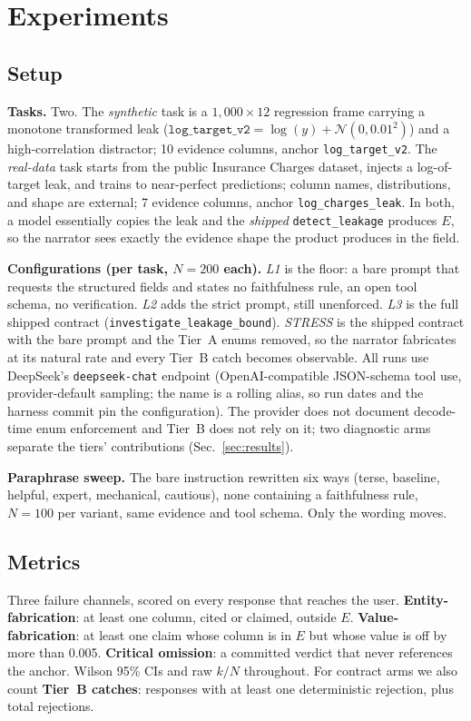 \documentclass[conference]{IEEEtran}
\begin{document}
\section{Experiments}
\label{sec:experiments}
\subsection{Setup}
\textbf{Tasks.} Two. The \emph{synthetic} task is a $1{,}000 \times 12$ regression frame carrying a monotone transformed leak ($\texttt{log\_target\_v2} = \log(y) + \mathcal{N}(0, 0.01^2)$) and a high-correlation distractor; 10 evidence columns, anchor \texttt{log\_target\_v2}. The \emph{real-data} task starts from the public Insurance Charges dataset, injects a log-of-target leak, and trains to near-perfect predictions; column names, distributions, and shape are external; 7 evidence columns, anchor \texttt{log\_charges\_leak}. In both, a model essentially copies the leak and the \emph{shipped} \texttt{detect\_leakage} produces $E$, so the narrator sees exactly the evidence shape the product produces in the field.

\textbf{Configurations (per task, $N=200$ each).} \emph{L1} is the floor: a bare prompt that requests the structured fields and states no faithfulness rule, an open tool schema, no verification. \emph{L2} adds the strict prompt, still unenforced. \emph{L3} is the full shipped contract (\texttt{investigate\_leakage\_bound}). \emph{STRESS} is the shipped contract with the bare prompt and the Tier~A enums removed, so the narrator fabricates at its natural rate and every Tier~B catch becomes observable. All runs use DeepSeek's \texttt{deepseek-chat} endpoint (OpenAI-compatible JSON-schema tool use, provider-default sampling; the name is a rolling alias, so run dates and the harness commit pin the configuration). The provider does not document decode-time enum enforcement and Tier~B does not rely on it; two diagnostic arms separate the tiers' contributions (Sec.~\ref{sec:results}).

\textbf{Paraphrase sweep.} The bare instruction rewritten six ways (terse, baseline, helpful, expert, mechanical, cautious), none containing a faithfulness rule, $N=100$ per variant, same evidence and tool schema. Only the wording moves.

\subsection{Metrics}
Three failure channels, scored on every response that reaches the user. \textbf{Entity-fabrication}: at least one column, cited or claimed, outside $E$. \textbf{Value-fabrication}: at least one claim whose column is in $E$ but whose value is off by more than 0.005. \textbf{Critical omission}: a committed verdict that never references the anchor. Wilson 95\% CIs and raw $k/N$ throughout. For contract arms we also count \textbf{Tier~B catches}: responses with at least one deterministic rejection, plus total rejections.
\end{document}
